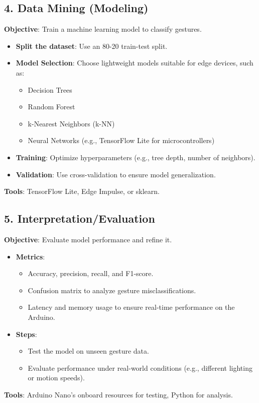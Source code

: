 \subsection{4. Data Mining (Modeling)}
\textbf{Objective}: Train a machine learning model to classify gestures.  
\begin{itemize}
    \item \textbf{Split the dataset}: Use an 80-20 train-test split.
    \item \textbf{Model Selection}: Choose lightweight models suitable for edge devices, such as:
          \begin{itemize}
              \item Decision Trees
              \item Random Forest
              \item k-Nearest Neighbors (k-NN)
              \item Neural Networks (e.g., TensorFlow Lite for microcontrollers)
          \end{itemize}
    \item \textbf{Training}: Optimize hyperparameters (e.g., tree depth, number of neighbors).
    \item \textbf{Validation}: Use cross-validation to ensure model generalization.
\end{itemize}
\textbf{Tools}: TensorFlow Lite, Edge Impulse, or sklearn.

\subsection{5. Interpretation/Evaluation}
\textbf{Objective}: Evaluate model performance and refine it.  
\begin{itemize}
    \item \textbf{Metrics}:
          \begin{itemize}
              \item Accuracy, precision, recall, and F1-score.
              \item Confusion matrix to analyze gesture misclassifications.
              \item Latency and memory usage to ensure real-time performance on the Arduino.
          \end{itemize}
    \item \textbf{Steps}:
          \begin{itemize}
              \item Test the model on unseen gesture data.
              \item Evaluate performance under real-world conditions (e.g., different lighting or motion speeds).
          \end{itemize}
\end{itemize}
\textbf{Tools}: Arduino Nano's onboard resources for testing, Python for analysis.

